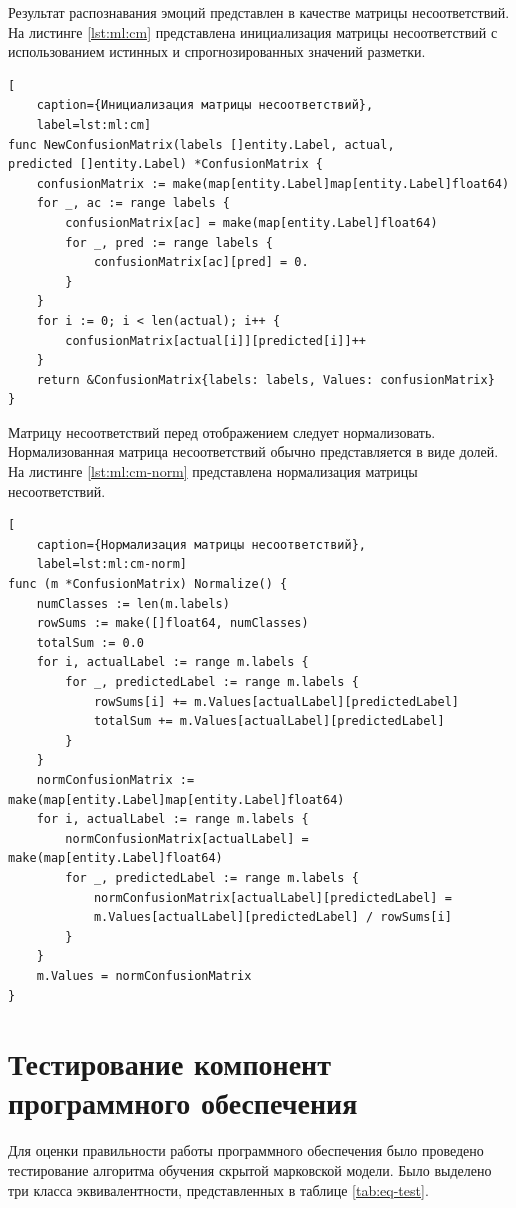 Результат распознавания эмоций представлен в качестве матрицы несоответствий. На листинге \ref{lst:ml:cm} представлена инициализация матрицы несоответствий с использованием истинных и спрогнозированных значений разметки.
\begin{lstlisting}[
	caption={Инициализация матрицы несоответствий},
	label=lst:ml:cm]
func NewConfusionMatrix(labels []entity.Label, actual,
predicted []entity.Label) *ConfusionMatrix {
	confusionMatrix := make(map[entity.Label]map[entity.Label]float64)
	for _, ac := range labels {
		confusionMatrix[ac] = make(map[entity.Label]float64)
		for _, pred := range labels {
			confusionMatrix[ac][pred] = 0.
		}
	}
	for i := 0; i < len(actual); i++ {
		confusionMatrix[actual[i]][predicted[i]]++
	}
	return &ConfusionMatrix{labels: labels, Values: confusionMatrix}
}
\end{lstlisting}
Матрицу несоответствий перед отображением следует нормализовать. Нормализованная матрица несоответствий обычно представляется в виде долей. На листинге \ref{lst:ml:cm-norm} представлена нормализация матрицы несоответствий.
\begin{lstlisting}[
	caption={Нормализация матрицы несоответствий},
	label=lst:ml:cm-norm]
func (m *ConfusionMatrix) Normalize() {
	numClasses := len(m.labels)
	rowSums := make([]float64, numClasses)
	totalSum := 0.0
	for i, actualLabel := range m.labels {
		for _, predictedLabel := range m.labels {
			rowSums[i] += m.Values[actualLabel][predictedLabel]
			totalSum += m.Values[actualLabel][predictedLabel]
		}
	}
	normConfusionMatrix := make(map[entity.Label]map[entity.Label]float64)
	for i, actualLabel := range m.labels {
		normConfusionMatrix[actualLabel] = make(map[entity.Label]float64)
		for _, predictedLabel := range m.labels {
			normConfusionMatrix[actualLabel][predictedLabel] = 
			m.Values[actualLabel][predictedLabel] / rowSums[i]
		}
	}
	m.Values = normConfusionMatrix
}
\end{lstlisting}


\section{Тестирование компонент программного обеспечения}
Для оценки правильности работы программного обеспечения было проведено тестирование алгоритма обучения скрытой марковской модели. Было выделено три класса эквивалентности, представленных в таблице \ref{tab:eq-test}.

